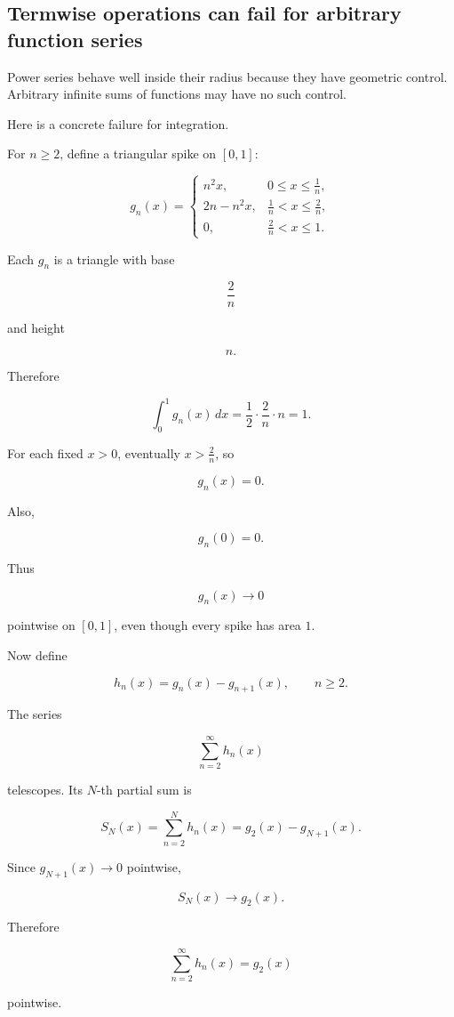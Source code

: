 \subsection{Termwise operations can fail for arbitrary function series}
\label{subsec:termwise-operations-fail}

Power series behave well inside their radius because they have geometric control.
Arbitrary infinite sums of functions may have no such control.

Here is a concrete failure for integration.

For \(n\ge2\), define a triangular spike on \([0,1]\):

\[
g_n(x)=
\begin{cases}
n^2x, & 0\le x\le \frac1n,\\[4pt]
2n-n^2x, & \frac1n<x\le \frac2n,\\[4pt]
0, & \frac2n<x\le1.
\end{cases}
\]

Each \(g_n\) is a triangle with base

\[
\frac2n
\]

and height

\[
n.
\]

Therefore

\[
\int_0^1 g_n(x)\,dx
=
\frac12\cdot \frac2n\cdot n
=
1.
\]

For each fixed \(x>0\), eventually \(x>\frac2n\), so

\[
g_n(x)=0.
\]

Also,

\[
g_n(0)=0.
\]

Thus

\[
g_n(x)\to0
\]

pointwise on \([0,1]\), even though every spike has area \(1\).

Now define

\[
h_n(x)=g_n(x)-g_{n+1}(x),
\qquad n\ge2.
\]

The series

\[
\sum_{n=2}^{\infty} h_n(x)
\]

telescopes.  Its \(N\)-th partial sum is

\[
S_N(x)=\sum_{n=2}^{N}h_n(x)
=
g_2(x)-g_{N+1}(x).
\]

Since \(g_{N+1}(x)\to0\) pointwise,

\[
S_N(x)\to g_2(x).
\]

Therefore

\[
\sum_{n=2}^{\infty}h_n(x)=g_2(x)
\]

pointwise.

